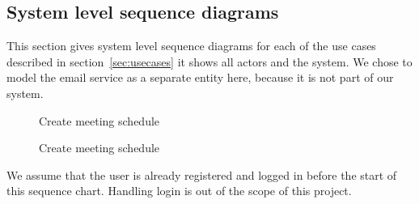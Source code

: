 \subsection{System level sequence diagrams}
	This section gives system level sequence diagrams for each of the use cases described in section~\ref{sec:usecases} it shows all actors and the system. We chose to model the email service as a separate entity here, because it is not part of our system.
	\begin{figure}[H]
		\centering
		\begin{msc}{Create meeting schedule}

			\nextlevel

			\nextlevel
	
			\nextlevel	

			\nextlevel
			\nextlevel

			\nextlevel
			\nextlevel

			\nextlevel

			\nextlevel

			\nextlevel
			\nextlevel

			\nextlevel
			
			\nextlevel
			\nextlevel

			\nextlevel
			
			\nextlevel
			\nextlevel

			\nextlevel

		\end{msc}
		\caption{Create meeting schedule}
		\label{smsc:createmeeting}
	\end{figure}
	
	We assume that the user is already registered and logged in before the start of this sequence chart. Handling login is out of the scope of this project.

